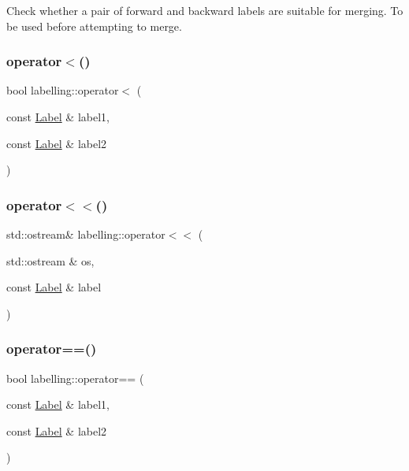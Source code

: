 Check whether a pair of forward and backward labels are suitable for merging. To be used before attempting to merge. \mbox{\label{namespacelabelling_a71cfecc2e31a39a8743e584c12b3fd32}} 
\subsubsection{\texorpdfstring{operator$<$()}{operator<()}}
{\footnotesize\ttfamily bool labelling\+::operator$<$ (\begin{DoxyParamCaption}\item[{const \hyperlink{classlabelling_1_1Label}{Label} \&}]{label1,  }\item[{const \hyperlink{classlabelling_1_1Label}{Label} \&}]{label2 }\end{DoxyParamCaption})}

\mbox{\label{namespacelabelling_ac988eedb6084b429a46b070f3ff6d544}} 
\subsubsection{\texorpdfstring{operator$<$$<$()}{operator<<()}}
{\footnotesize\ttfamily std\+::ostream\& labelling\+::operator$<$$<$ (\begin{DoxyParamCaption}\item[{std\+::ostream \&}]{os,  }\item[{const \hyperlink{classlabelling_1_1Label}{Label} \&}]{label }\end{DoxyParamCaption})}

\mbox{\label{namespacelabelling_a96ce48b2672548c132a1032820202375}} 
\subsubsection{\texorpdfstring{operator==()}{operator==()}}
{\footnotesize\ttfamily bool labelling\+::operator== (\begin{DoxyParamCaption}\item[{const \hyperlink{classlabelling_1_1Label}{Label} \&}]{label1,  }\item[{const \hyperlink{classlabelling_1_1Label}{Label} \&}]{label2 }\end{DoxyParamCaption})}

